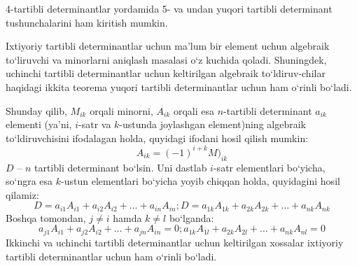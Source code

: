 4-tartibli determinantlar yordamida 5- va undan yuqori tartibli determinant tushunchalarini ham kiritish mumkin.

Ixtiyoriy tartibli determinantlar uchun ma'lum bir element uchun algebraik to`liruvchi va minorlarni aniqlash masalasi o`z kuchida qoladi. Shuningdek, uchinchi tartibli determinantlar uchun keltirilgan algebraik to`ldiruv-chilar haqidagi  ikkita teorema yuqori tartibli determinantlar uchun ham o`rinli bo`ladi.

Shunday qilib, $M_{ik}$ orqali minorni, $A_{ik}$ orqali esa $n$-tartibli determinant $a_{ik}$ elementi (ya'ni, $i$-satr va $k$-ustunda joylashgan element)ning algebraik to`ldiruvchisini ifodalagan holda, quyidagi ifodani hosil qilish mumkin:
\begin{equation}
	A_{ik}=(-1)^{i+k}M)_{ik}
	\label{4.2}
\end{equation}
$D$ -- $n$ tartibli determinant bo`lsin. Uni dastlab $i$-satr elementlari bo`yicha, so`ngra esa $k$-ustun elementlari bo`yicha yoyib chiqqan holda, quyidagini hosil qilamiz:
\begin{subequations}
\begin{equation}
	D=a_{i1}A_{i1}+a_{i2}A_{i2}+\ldots +a_{in}A_{in};
	\label{4.3a}
\end{equation}
\begin{equation}
	D=a_{1k}A_{1k}+a_{2k}A_{2k}+\ldots+a_{nk}A_{nk}
\label{4.3b}
\end{equation}
\end{subequations}
Boshqa tomondan, $j\ne i$ hamda $k\ne l$ bo`lganda:
\begin{subequations}
	\begin{equation}
		a_{j1}A_{i1}+a_{j2}A_{i2}+\ldots+a_{jn}A_{in}=0;
		\label{4.4a}
	\end{equation}
\begin{equation}
	a_{1k}A_{1l}+a_{2k}A_{2l}+\ldots+a_{nk}A_{nl}=0
	\label{4.4b}
\end{equation}
\end{subequations}
Ikkinchi va uchinchi tartibli determinantlar uchun keltirilgan xossalar ixtiyoriy tartibli determinantlar uchun ham o`rinli bo`ladi.

